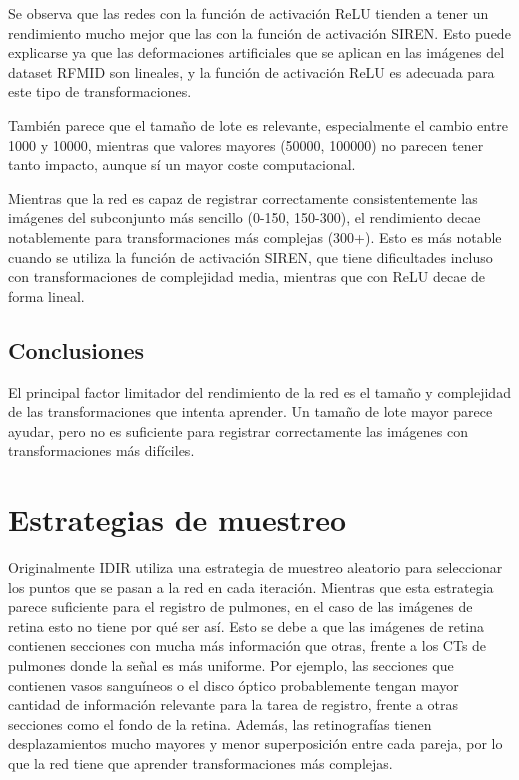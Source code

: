 Se observa que las redes con la función de activación ReLU tienden a tener un rendimiento mucho mejor que las con la función de activación SIREN. Esto puede explicarse ya que las deformaciones artificiales que se aplican en las imágenes del dataset RFMID son lineales, y la función de activación ReLU es adecuada para este tipo de transformaciones.

También parece que el tamaño de lote es relevante, especialmente el cambio entre 1000 y 10000, mientras que valores mayores (50000, 100000) no parecen tener tanto impacto, aunque sí un mayor coste computacional.

Mientras que la red es capaz de registrar correctamente consistentemente las imágenes del subconjunto más sencillo (0-150, 150-300), el rendimiento decae notablemente para transformaciones más complejas (300+).
Esto es más notable cuando se utiliza la función de activación SIREN, que tiene dificultades incluso con transformaciones de complejidad media, mientras que con ReLU decae de forma lineal.

\subsection{Conclusiones}\label{subsec:Conclusions-batchsize}

El principal factor limitador del rendimiento de la red es el tamaño y complejidad de las transformaciones que intenta aprender.
Un tamaño de lote mayor parece ayudar, pero no es suficiente para registrar correctamente las imágenes con transformaciones más difíciles.

\section{Estrategias de muestreo}
\label{sec:Estratexias de mostraxe}

Originalmente IDIR utiliza una estrategia de muestreo aleatorio para seleccionar los puntos que se pasan a la red en cada iteración.
Mientras que esta estrategia parece suficiente para el registro de pulmones, en el caso de las imágenes de retina esto no tiene por qué ser así.
Esto se debe a que las imágenes de retina contienen secciones con mucha más información que otras, frente a los CTs de pulmones donde la señal es más uniforme.
Por ejemplo, las secciones que contienen vasos sanguíneos o el disco óptico probablemente tengan mayor cantidad de información relevante para la tarea de registro, frente a otras secciones como el fondo de la retina.
Además, las retinografías tienen desplazamientos mucho mayores y menor superposición entre cada pareja, por lo que la red tiene que aprender transformaciones más complejas.

